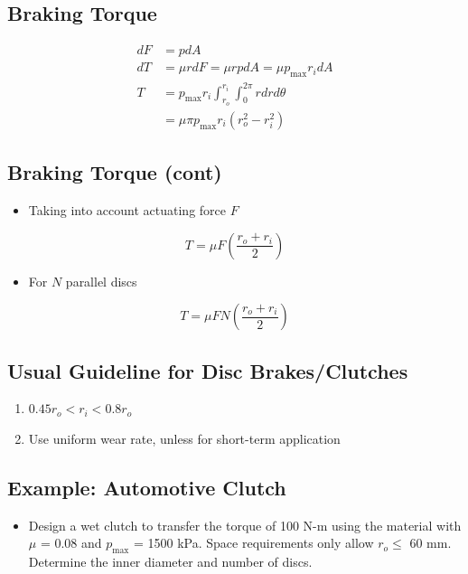 \documentclass[
10pt,
a4paper,
openany,
svgnames,
]{book}
\begin{document}
\subsection*{Braking Torque}
\label{sec:org9a3df3a}

\begin{align*}
    dF &= pdA \\
    dT &= \mu r dF = \mu r p dA = \mu p_{\max} r_i dA \\
    T &= p_{\max} r_i \int_{r_o}^{r_i} \int_0^{2\pi} r dr d\theta \\
        &= \mu \pi p_{\max} r_i \left( r_o^2 - r_i^2 \right)
\end{align*}

\subsection*{Braking Torque (cont)}
\label{sec:org7aabdd0}

\begin{itemize}
\item Taking into account actuating force \(F\)
\end{itemize}

$$ T = \mu F \left( \frac{r_o + r_i}{2} \right) $$

\begin{itemize}
\item For \(N\) parallel discs
\end{itemize}

$$ T = \mu F N \left( \frac{r_o + r_i}{2} \right) $$

\subsection*{Usual Guideline for Disc Brakes/Clutches}
\label{sec:org2c4bcfe}

\begin{enumerate}
\item \(0.45r_o < r_i < 0.8r_o\)
\item Use uniform wear rate, unless for short-term application
\end{enumerate}

\subsection*{Example: Automotive Clutch}
\label{sec:org7951c2e}

\begin{itemize}
\item Design a wet clutch to transfer the torque of 100 N-m using the material with \(\mu\) = 0.08 and \(p_{\max}\) = 1500 kPa. Space requirements only allow \(r_o \leqslant\) 60 mm. Determine the inner diameter and number of discs.
\end{itemize}
\end{document}
